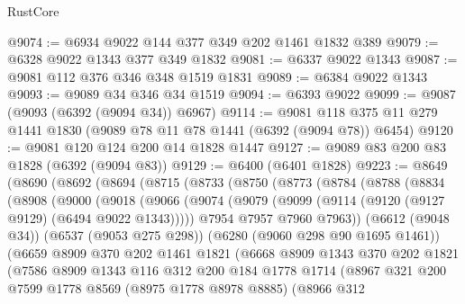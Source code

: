 \begin{lexlean}{RustCore}
\begin{coremodule}
@9074 := @6934 @9022 @144 @377 @349 @202 @1461 @1832 @389
@9079 := @6328 @9022 @1343 @377 @349 @1832
@9081 := @6337 @9022 @1343
@9087 := @9081 @112 @376 @346 @348 @1519 @1831
@9089 := @6384 @9022 @1343
@9093 := @9089 @34 @346 @34 @1519
@9094 := @6393 @9022
@9099 := @9087 (@9093 (@6392 (@9094 @34)) @6967)
@9114 := @9081 @118 @375 @11 @279 @1441 @1830 (@9089 @78 @11 @78 @1441 (@6392 (@9094 @78)) @6454)
@9120 := @9081 @120 @124 @200 @14 @1828 @1447
@9127 := @9089 @83 @200 @83 @1828 (@6392 (@9094 @83))
@9129 := @6400 (@6401 @1828)
@9223 := @8649
    (@8690
      (@8692
        (@8694
          (@8715
            (@8733
              (@8750
                (@8773
                  (@8784
                    (@8788
                      (@8834
                        (@8908
                          (@9000
                            (@9018
                              (@9066
                                (@9074
                                  (@9079 (@9099 (@9114 (@9120 (@9127 @9129) (@6494 @9022 @1343)))))
                                  @7954
                                  @7957
                                  @7960
                                  @7963))
                              (@6612 (@9048 @34))
                              (@6537 (@9053 @275 @298))
                              (@6280 (@9060 @298 @90 @1695 @1461))
                              (@6659
                                @8909
                                @370
                                @202
                                @1461
                                @1821
                                (@6668
                                  @8909
                                  @1343
                                  @370
                                  @202
                                  @1821
                                  (@7586
                                    @8909
                                    @1343
                                    @116
                                    @312
                                    @200
                                    @184
                                    @1778
                                    @1714
                                    (@8967
                                      @321
                                      @200
                                      @7599
                                      @1778
                                      @8569
                                      (@8975 @1778 @8978 @8885)
                                      (@8966
                                        @312

\end{coremodule}
\end{lexlean}
